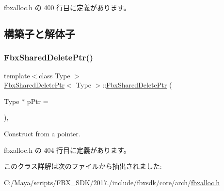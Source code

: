  fbxalloc.\+h の 400 行目に定義があります。



\subsection{構築子と解体子}
\mbox{\label{class_fbx_shared_delete_ptr_a35665b463cbb2e437b4bf3a228de8678}} 
\subsubsection{\texorpdfstring{Fbx\+Shared\+Delete\+Ptr()}{FbxSharedDeletePtr()}}
{\footnotesize\ttfamily template$<$class Type $>$ \\
\hyperlink{class_fbx_shared_delete_ptr}{Fbx\+Shared\+Delete\+Ptr}$<$ Type $>$\+::\hyperlink{class_fbx_shared_delete_ptr}{Fbx\+Shared\+Delete\+Ptr} (\begin{DoxyParamCaption}\item[{Type $\ast$}]{p\+Ptr = {} }\end{DoxyParamCaption})\hspace{0.3cm}{\ttfamily [inline]}, {\ttfamily [explicit]}}



Construct from a pointer. 



 fbxalloc.\+h の 404 行目に定義があります。



このクラス詳解は次のファイルから抽出されました\+:\begin{DoxyCompactItemize}
\item 
C\+:/\+Maya/scripts/\+F\+B\+X\+\_\+\+S\+D\+K/2017./include/fbxsdk/core/arch/\hyperlink{fbxalloc_8h}{fbxalloc.\+h}\end{DoxyCompactItemize}
